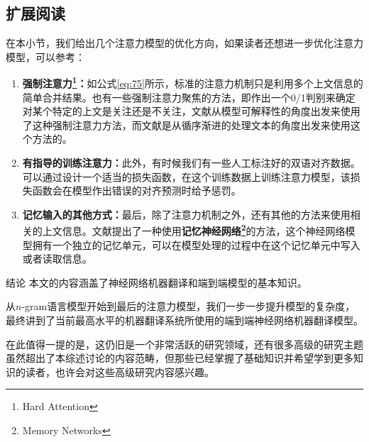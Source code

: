 \documentclass[10pt,a4paper]{ctexart}
\makeatletter
\renewcommand{\section}{\@startsection{section}{1}{0mm}
  {-\baselineskip}{0.5\baselineskip}{\bf\leftline}}
\makeatother
\begin{document}
\subsection{扩展阅读}
在本小节，我们给出几个注意力模型的优化方向，如果读者还想进一步优化注意力模型，可以参考：
\begin{enumerate}
\item[] \textbf{强制注意力\footnote{Hard Attention}：}如公式\ref{eq:75}所示，标准的注意力机制只是利用多个上文信息的简单合并结果。也有一些强制注意力聚焦的方法，即作出一个0/1判别来确定对某个特定的上文是关注还是不关注，文献\cite{lei2016rationalizing}从模型可解释性的角度出发来使用了这种强制注意力方法，而文献\cite{yu2016online,gu2016learning}是从循序渐进的处理文本的角度出发来使用这个方法的。
\item[] \textbf{有指导的训练注意力：}此外，有时候我们有一些人工标注好的双语对齐数据。可以通过设计一个适当的损失函数，在这个训练数据上训练注意力模型，该损失函数会在模型作出错误的对齐预测时给予惩罚\cite{mi2016supervised}。
\item[] \textbf{记忆输入的其他方式：}最后，除了注意力机制之外，还有其他的方法来使用相关的上文信息。文献\cite{wang2016memory}提出了一种使用\textbf{记忆神经网络\footnote{Memory Networks}}的方法，这个神经网络模型拥有一个独立的记忆单元，可以在模型处理的过程中在这个记忆单元中写入或者读取信息。
\end{enumerate}


\section{结论}
本文的内容涵盖了神经网络机器翻译和端到端模型的基本知识。

从$n$-gram语言模型开始到最后的注意力模型，我们一步一步提升模型的复杂度，最终讲到了当前最高水平的机器翻译系统所使用的端到端神经网络机器翻译模型。

在此值得一提的是，这仍旧是一个非常活跃的研究领域，还有很多高级的研究主题虽然超出了本综述讨论的内容范畴，但那些已经掌握了基础知识并希望学到更多知识的读者，也许会对这些高级研究内容感兴趣。
\end{document}

